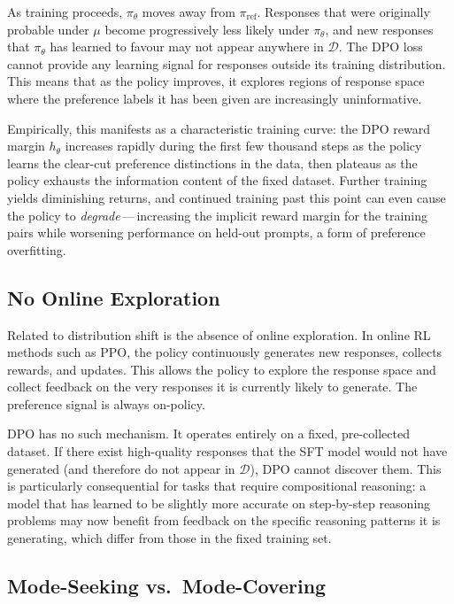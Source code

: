 As training proceeds, $\pi_\theta$ moves away from $\pi_\mathrm{ref}$. Responses that were originally probable under $\mu$ become progressively less likely under $\pi_\theta$, and new responses that $\pi_\theta$ has learned to favour may not appear anywhere in $\mathcal{D}$. The DPO loss cannot provide any learning signal for responses outside its training distribution. This means that as the policy improves, it explores regions of response space where the preference labels it has been given are increasingly uninformative.

Empirically, this manifests as a characteristic training curve: the DPO reward margin $h_\theta$ increases rapidly during the first few thousand steps as the policy learns the clear-cut preference distinctions in the data, then plateaus as the policy exhausts the information content of the fixed dataset. Further training yields diminishing returns, and continued training past this point can even cause the policy to \emph{degrade}\,---\,increasing the implicit reward margin for the training pairs while worsening performance on held-out prompts, a form of preference overfitting.

\subsection{No Online Exploration}

Related to distribution shift is the absence of online exploration. In online RL methods such as PPO, the policy continuously generates new responses, collects rewards, and updates. This allows the policy to explore the response space and collect feedback on the very responses it is currently likely to generate. The preference signal is always on-policy.

DPO has no such mechanism. It operates entirely on a fixed, pre-collected dataset. If there exist high-quality responses that the SFT model would not have generated (and therefore do not appear in $\mathcal{D}$), DPO cannot discover them. This is particularly consequential for tasks that require compositional reasoning: a model that has learned to be slightly more accurate on step-by-step reasoning problems may now benefit from feedback on the specific reasoning patterns it is generating, which differ from those in the fixed training set.

\subsection{Mode-Seeking vs.\ Mode-Covering}

